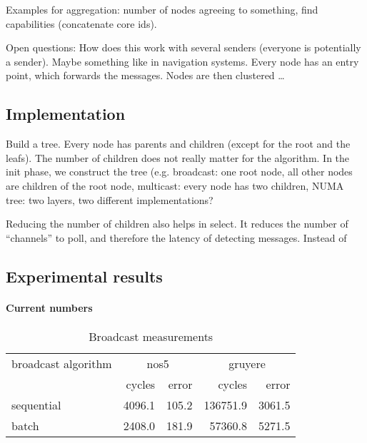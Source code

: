 \documentclass{article}
\begin{document}
Examples for aggregation: number of nodes agreeing to something, find
capabilities (concatenate core ids). 

Open questions: How does this work with several senders (everyone is
potentially a sender). Maybe something like in navigation
systems. Every node has an entry point, which forwards the
messages. Nodes are then clustered \ldots

\subsection{Implementation}

Build a tree. Every node has parents and children (except for the root
and the leafs). The number of children does not really matter for the
algorithm. In the init phase, we construct the tree (e.g. broadcast:
one root node, all other nodes are children of the root node,
multicast: every node has two children, NUMA tree: two layers, two
different implementations?

Reducing the number of children also helps in select. It reduces the
number of ``channels'' to poll, and therefore the latency of detecting
messages. Instead of 

\subsection{Experimental results}

\paragraph{Current numbers}

\begin{table}[htb]
  \centering
  \begin{tabular}{lrrrr}
    \toprule
    broadcast algorithm & \multicolumn{2}{c}{nos5} & \multicolumn{2}{c}{gruyere} \\
      & cycles & error & cycles & error \\
    \midrule
    sequential &  4096.1 &  105.2 & 136751.9 &   3061.5 \\
    batch      &  2408.0 &  181.9 &  57360.8 &   5271.5 \\
    \bottomrule
  \end{tabular}
  \caption{Broadcast measurements}
  \label{tab:bc_measurements}
\end{table}
\end{document}
